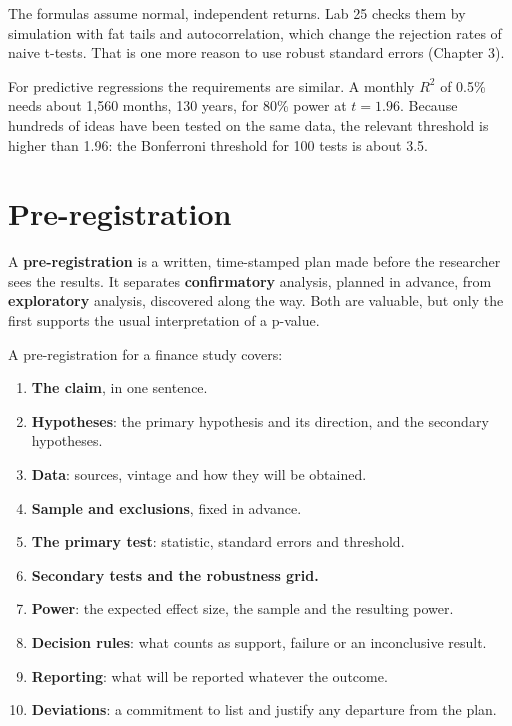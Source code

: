 The formulas assume normal, independent returns. Lab 25 checks them by simulation with fat tails and autocorrelation, which change the rejection rates of naive t-tests. That is one more reason to use robust standard errors (Chapter 3).

For predictive regressions the requirements are similar. A monthly $R^2$ of 0.5\% needs about 1,560 months, 130 years, for 80\% power at $t = 1.96$. Because hundreds of ideas have been tested on the same data, the relevant threshold is higher than 1.96: the Bonferroni threshold for 100 tests is about 3.5.

\section{Pre-registration}
\label{sec:25-prereg}

A \textbf{pre-registration} is a written, time-stamped plan made before the researcher sees the results. It separates \textbf{confirmatory} analysis, planned in advance, from \textbf{exploratory} analysis, discovered along the way. Both are valuable, but only the first supports the usual interpretation of a p-value.

A pre-registration for a finance study covers:

\begin{enumerate}
  \item \textbf{The claim}, in one sentence.
  \item \textbf{Hypotheses}: the primary hypothesis and its direction, and the secondary hypotheses.
  \item \textbf{Data}: sources, vintage and how they will be obtained.
  \item \textbf{Sample and exclusions}, fixed in advance.
  \item \textbf{The primary test}: statistic, standard errors and threshold.
  \item \textbf{Secondary tests and the robustness grid.}
  \item \textbf{Power}: the expected effect size, the sample and the resulting power.
  \item \textbf{Decision rules}: what counts as support, failure or an inconclusive result.
  \item \textbf{Reporting}: what will be reported whatever the outcome.
  \item \textbf{Deviations}: a commitment to list and justify any departure from the plan.
\end{enumerate}

